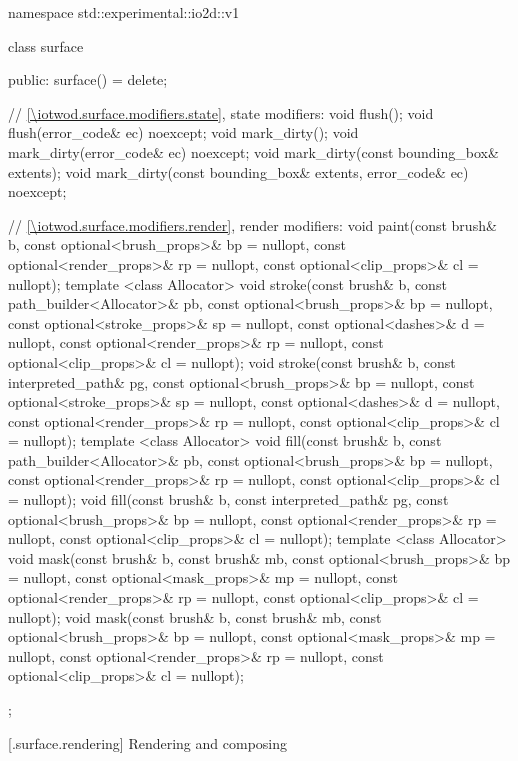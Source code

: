 \begin{codeblock}
namespace std::experimental::io2d::v1 {
  class surface {
  public:
    surface() = delete;
    
    // \ref{\iotwod.surface.modifiers.state}, state modifiers:
    void flush();
    void flush(error_code& ec) noexcept;
    void mark_dirty();
    void mark_dirty(error_code& ec) noexcept;
    void mark_dirty(const bounding_box& extents);
    void mark_dirty(const bounding_box& extents, error_code& ec) noexcept;

    // \ref{\iotwod.surface.modifiers.render}, render modifiers:
    void paint(const brush& b, const optional<brush_props>& bp = nullopt,
      const optional<render_props>& rp = nullopt,
      const optional<clip_props>& cl = nullopt);
    template <class Allocator>
    void stroke(const brush& b, const path_builder<Allocator>& pb,
      const optional<brush_props>& bp = nullopt,
      const optional<stroke_props>& sp = nullopt,
      const optional<dashes>& d = nullopt,
      const optional<render_props>& rp = nullopt,
      const optional<clip_props>& cl = nullopt);
    void stroke(const brush& b, const interpreted_path& pg,
      const optional<brush_props>& bp = nullopt,
      const optional<stroke_props>& sp = nullopt,
      const optional<dashes>& d = nullopt,
      const optional<render_props>& rp = nullopt,
      const optional<clip_props>& cl = nullopt);
    template <class Allocator>
    void fill(const brush& b, const path_builder<Allocator>& pb,
      const optional<brush_props>& bp = nullopt,
      const optional<render_props>& rp = nullopt,
      const optional<clip_props>& cl = nullopt);
    void fill(const brush& b, const interpreted_path& pg,
      const optional<brush_props>& bp = nullopt,
      const optional<render_props>& rp = nullopt,
      const optional<clip_props>& cl = nullopt);
    template <class Allocator>
    void mask(const brush& b, const brush& mb,
      const optional<brush_props>& bp = nullopt,
      const optional<mask_props>& mp = nullopt,
      const optional<render_props>& rp = nullopt,
      const optional<clip_props>& cl = nullopt);
    void mask(const brush& b, const brush& mb,
      const optional<brush_props>& bp = nullopt,
      const optional<mask_props>& mp = nullopt,
      const optional<render_props>& rp = nullopt,
      const optional<clip_props>& cl = nullopt);
  };
}
\end{codeblock}

 [\iotwod.surface.rendering] {Rendering and composing}


